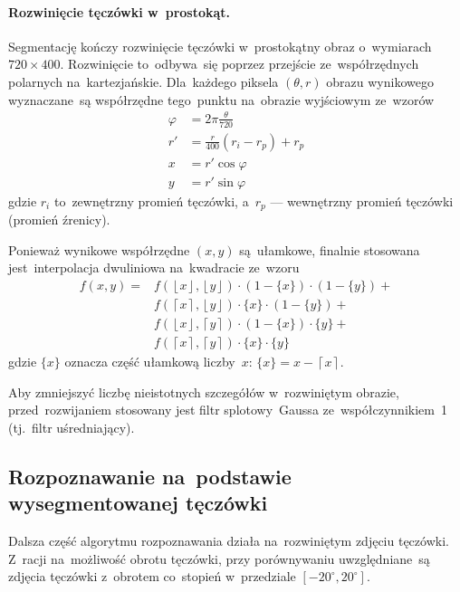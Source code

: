 \documentclass[11pt,a4paper]{article}
\begin{document}
\paragraph{Rozwinięcie tęczówki w~prostokąt.}
Segmentację kończy rozwinięcie tęczówki w~prostokątny obraz o~wymiarach $720 \times 400$.
Rozwinięcie to~odbywa~się poprzez przejście ze~współrzędnych polarnych na~kartezjańskie.
Dla~każdego piksela $(\theta,r)$ obrazu wynikowego wyznaczane~są współrzędne tego~punktu na~obrazie wyjściowym ze~wzorów
\begin{align*}
    \varphi &= 2 \pi \frac{\theta}{720} \\
    r' &= \frac{r}{400} (r_i - r_p) + r_p \\
    x &= r' \cos \varphi \\
    y &= r' \sin \varphi
\end{align*}
gdzie $r_i$ to~zewnętrzny promień tęczówki, a~$r_p$ --- wewnętrzny promień tęczówki (promień źrenicy).

Ponieważ wynikowe współrzędne $(x,y)$ są~ułamkowe, finalnie stosowana jest~interpolacja dwuliniowa na~kwadracie ze~wzoru
\begin{align*}
    f(x, y) = & f(\left\lfloor x \right\rfloor, \left\lfloor y \right\rfloor) \cdot (1 - \{ x \}) \cdot (1 - \{ y \}) + \\
    & f(\left\lceil x \right\rceil, \left\lfloor y \right\rfloor) \cdot \{ x \} \cdot (1 - \{ y \}) + \\
    & f(\left\lfloor x \right\rfloor, \left\lceil y \right\rceil) \cdot (1 - \{ x \}) \cdot \{ y \} + \\
    & f(\left\lceil x \right\rceil, \left\lceil y \right\rceil) \cdot \{ x \} \cdot \{ y \}
\end{align*}
gdzie $\{ x \}$ oznacza część ułamkową liczby~$x$: $\{ x \} = x - \left\lceil x \right\rceil$.

Aby zmniejszyć liczbę nieistotnych szczegółów w~rozwiniętym obrazie, przed~rozwijaniem stosowany jest filtr splotowy~Gaussa ze~współczynnikiem~1 (tj.~filtr uśredniający).

\subsection{Rozpoznawanie na~podstawie wysegmentowanej tęczówki}
\label{subsec:recognition}
Dalsza część algorytmu rozpoznawania działa na~rozwiniętym zdjęciu tęczówki.
Z~racji na~możliwość obrotu tęczówki, przy porównywaniu uwzględniane~są zdjęcia tęczówki z~obrotem co~stopień w~przedziale $[-20^\circ, 20^\circ]$.
\end{document}
